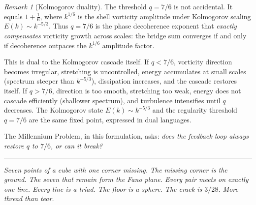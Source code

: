 \documentclass[11pt]{article}
\theoremstyle{definition}
\theoremstyle{remark}
\newtheorem{remark}[theorem]{Remark}
\begin{document}
\begin{remark}[Kolmogorov duality]
The threshold $q = 7/6$ is not accidental. It equals
$1 + \tfrac{1}{6}$, where $k^{1/6}$ is the shell vorticity amplitude
under Kolmogorov scaling $E(k) \sim k^{-5/3}$.
Thus $q = 7/6$ is the phase decoherence exponent that
\emph{exactly compensates} vorticity growth across scales:
the bridge sum converges if and only if decoherence
outpaces the $k^{1/6}$ amplitude factor.

This is dual to the Kolmogorov cascade itself.
If $q < 7/6$, vorticity direction becomes irregular,
stretching is uncontrolled, energy accumulates at small scales
(spectrum steeper than $k^{-5/3}$), dissipation increases,
and the cascade restores itself.
If $q > 7/6$, direction is too smooth, stretching too weak,
energy does not cascade efficiently (shallower spectrum),
and turbulence intensifies until $q$ decreases.
The Kolmogorov state $E(k) \sim k^{-5/3}$ and the
regularity threshold $q = 7/6$ are the same fixed point,
expressed in dual languages.

The Millennium Problem, in this formulation, asks:
\emph{does the feedback loop always restore $q$ to $7/6$,
or can it break?}
\end{remark}

\bigskip
\begin{center}\rule{2in}{0.4pt}\end{center}

\medskip
\noindent\textit{Seven points of a cube with one corner missing.
The missing corner is the ground. The seven that remain form the Fano
plane. Every pair meets on exactly one line. Every line is a triad.
The floor is a sphere. The crack is $3/28$. More thread than tear.}
\end{document}
